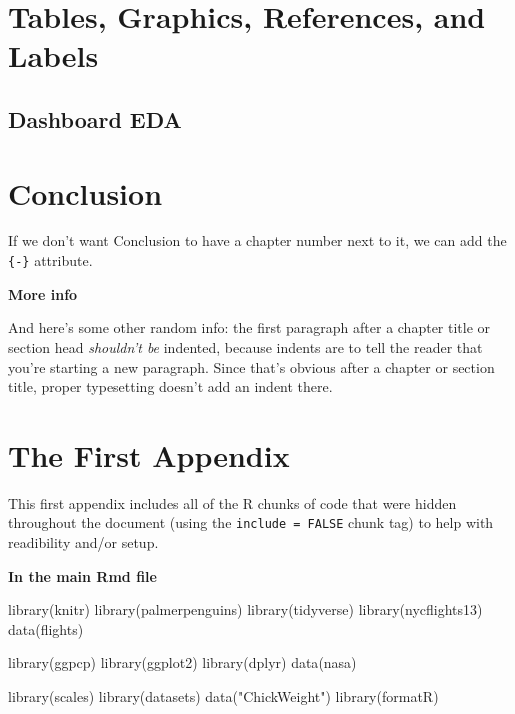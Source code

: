 \documentclass[print]{nuthesis}
\newenvironment{Shaded}{\begin{snugshade}}{\end{snugshade}}
\newcommand{\FunctionTok}[1]{\textcolor[rgb]{0.00,0.00,0.00}{#1}}
\newcommand{\NormalTok}[1]{#1}
\newcommand{\StringTok}[1]{\textcolor[rgb]{0.31,0.60,0.02}{#1}}
\begin{document}
\hypertarget{ref-labels}{%
\chapter{Tables, Graphics, References, and Labels}\label{ref-labels}}

\hypertarget{dashboard-eda}{%
\section{Dashboard EDA}\label{dashboard-eda}}

\hypertarget{conclusion-1}{%
\chapter*{Conclusion}\label{conclusion-1}}

If we don't want Conclusion to have a chapter number next to it, we can add the \texttt{\{-\}} attribute.

\textbf{More info}

And here's some other random info: the first paragraph after a chapter title or section head \emph{shouldn't be} indented, because indents are to tell the reader that you're starting a new paragraph. Since that's obvious after a chapter or section title, proper typesetting doesn't add an indent there.

\appendix

\hypertarget{the-first-appendix}{%
\chapter{The First Appendix}\label{the-first-appendix}}

This first appendix includes all of the R chunks of code that were hidden throughout the document (using the \texttt{include\ =\ FALSE} chunk tag) to help with readibility and/or setup.

\textbf{In the main Rmd file}

\begin{Shaded}
\begin{Highlighting}[]
\FunctionTok{library}\NormalTok{(knitr)}
\FunctionTok{library}\NormalTok{(palmerpenguins)}
\FunctionTok{library}\NormalTok{(tidyverse)}
\FunctionTok{library}\NormalTok{(nycflights13)}
\FunctionTok{data}\NormalTok{(flights)}

\FunctionTok{library}\NormalTok{(ggpcp)}
\FunctionTok{library}\NormalTok{(ggplot2)}
\FunctionTok{library}\NormalTok{(dplyr)}
\FunctionTok{data}\NormalTok{(nasa)}

\FunctionTok{library}\NormalTok{(scales)}
\FunctionTok{library}\NormalTok{(datasets)}
\FunctionTok{data}\NormalTok{(}\StringTok{"ChickWeight"}\NormalTok{)}
\FunctionTok{library}\NormalTok{(formatR)}
\end{Highlighting}
\end{Shaded}
\end{document}
